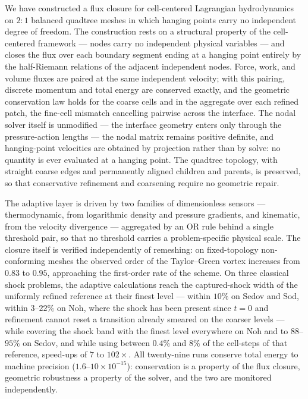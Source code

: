 \documentclass[a4paper]{cas-sc}
\begin{document}
We have constructed a flux closure for cell-centered Lagrangian
hydrodynamics on $2\!:\!1$ balanced quadtree meshes in which hanging
points carry no independent degree of freedom. The construction rests
on a structural property of the cell-centered framework --- nodes
carry no independent physical variables --- and closes the flux over
each boundary segment ending at a hanging point entirely by the
half-Riemann relations of the adjacent independent nodes. Force,
work, and volume fluxes are paired at the same independent velocity;
with this pairing, discrete momentum and total energy are conserved
exactly, and the geometric conservation law holds for the coarse cells and in
the aggregate over each refined patch, the fine-cell mismatch
cancelling pairwise across the interface. The nodal solver itself is
unmodified --- the interface geometry enters only through the
pressure-action lengths --- the nodal matrix remains positive
definite, and hanging-point velocities are obtained by projection
rather than by solve: no quantity is ever evaluated at a hanging
point. The quadtree topology, with straight coarse edges and
permanently aligned children and parents, is preserved, so that
conservative refinement and coarsening require no geometric repair.

The adaptive layer is driven by two families of dimensionless sensors ---
thermodynamic, from logarithmic density and pressure gradients, and kinematic,
from the velocity divergence --- aggregated by an OR rule behind a single
threshold pair, so that no threshold carries a problem-specific physical
scale. The closure itself is verified independently of remeshing: on
fixed-topology non-conforming meshes the observed order of the Taylor--Green
vortex increases from $0.83$ to $0.95$, approaching the first-order rate of
the scheme. On three classical shock problems, the adaptive calculations reach
the captured-shock width of the uniformly refined reference at their finest
level --- within $10\%$ on Sedov and Sod, within $3$--$22\%$ on Noh, where the
shock has been present since $t=0$ and refinement cannot reset a transition
already smeared on the coarser levels --- while covering the shock band with
the finest level everywhere on Noh and to $88$--$95\%$ on Sedov, and while
using between $0.4\%$ and $8\%$ of the cell-steps of that reference, speed-ups
of $7$ to $102\times$. All twenty-nine runs conserve total energy to machine
precision ($1.6$--$10\times10^{-15}$): conservation is a property of the flux
closure, geometric robustness a property of the solver, and the two are
monitored independently.
\end{document}
